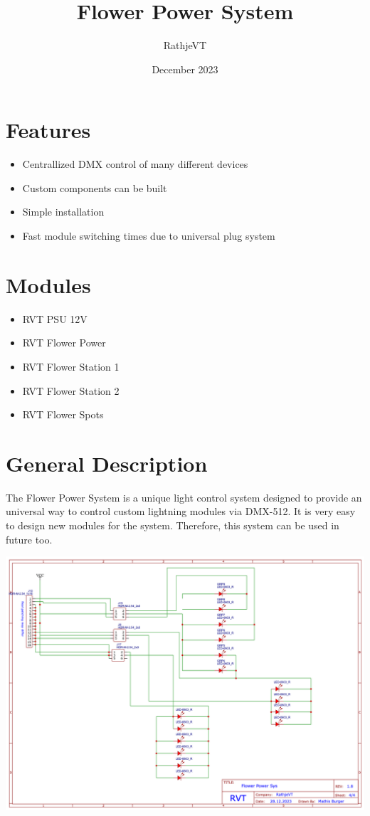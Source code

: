 \documentclass[10pt]{datasheet}
\title{Flower Power System}
\author{RathjeVT}
\date{December 2023}
\begin{document}
\maketitle

\section{Features}

\begin{itemize}
\item{Centrallized DMX control of many different devices}
\item{Custom components can be built}
\item{Simple installation}
\item{Fast module switching times due to universal plug system}
\end{itemize}

\section{Modules}

\begin{itemize}
\item{RVT PSU 12V}
\item{RVT Flower Power}
\item{RVT Flower Station 1}
\item{RVT Flower Station 2}
\item{RVT Flower Spots}
\end{itemize}

\section{General Description}
The Flower Power System is a unique light control system designed to provide an universal
way to control custom lightning modules via DMX-512. It is very easy to design new modules for 
the system. Therefore, this system can be used in future too.

\vfill\break

\includegraphics[scale=0.2]{Flower Power System.png}
\onecolumn
\end{document}
